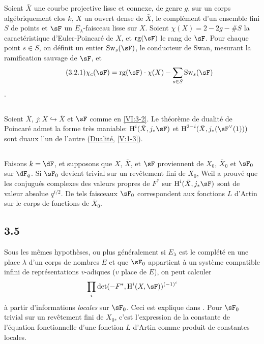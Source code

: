 Soient $\bar X$ une courbe projective lisse et connexe, de genre $g$, sur un 
corps algébriquement clos $k$, $X$ un ouvert dense de $\bar X$, 
le complément d'un ensemble fini $S$ de points et $\sF$ un 
$E_\lambda$-faisceau lisse sur $X$. Soient $\chi(X)=2-2 g-\# S$ la 
caractéristique d'Euler-Poincaré de $X$, et $\operatorname{rg}(\sF)$ le 
rang de $\sF$. Pour chaque point $s\in S$, on définit un entier 
$\swan_s(\sF)$, le conducteur de Swan, mesurant la ramification sauvage de 
$\sF$, et 
\begin{align*}\tag{3.2.1}\label{VI:eq:3-2-1}
  \chi_c(\sF) = \operatorname{rg}(\sF) \cdot \chi(X) - \sum_{s\in S} \swan_s(\sF) 
\end{align*}
\cite{ra65}. 





\subsection{}\label{VI:3-3}

Soient $\bar X$, $j:X\hookrightarrow\bar X$ et $\sF$ comme en \ref{VI:3-2}. Le 
théorème de dualité de Poincaré admet la forme très maniable: 
$\h^i(\bar X,j_\ast \sF)$ et $\h^{2-i}(\bar X,j_\ast(\sF^\vee(1)))$ sont 
duaux l'un de l'autre (\hyperref[V]{Dualité}, \ref{V:1-3}). 





\subsection{}\label{VI:3-4}

Faisons $k=\dF$, et supposons que $X$, $\bar X$, et $\sF$ proviennent de 
$X_0$, $\bar X_0$ et $\sF_0$ sur $\dF_q$. Si $\sF_0$ devient trivial sur un 
revêtement fini de $X_0$, Weil a prouvé que les conjugués complexes des 
valeurs propres de $F^\ast$ sur $\h^i(\bar X,j_\ast\sF)$ sont de valeur 
absolue $q^{i/2}$. De tels faisceaux $\sF_0$ correspondent aux fonctions $L$ 
d'Artin sur le corps de fonctions de $\bar X_0$. 





\subsection*{3.5}\label{VI:3-5_} %

Sous les mêmes hypothèses, ou plus généralement si $E_\lambda$ est le 
complété en une place $\lambda$ d'un corps de nombres $E$ et que $\sF_0$ 
appartient à un système compatible infini de représentations $v$-adiques 
($v$ place de $E$), on peut calculer 
\[
  \prod_i \det(-F^\ast,\h^i(X,\sF))^{(-1)^i} 
\]
à partir d'informations \emph{locales} sur $\sF_0$. Ceci est explique dans 
\cite{de73}. Pour $\sF_0$ trivial sur un revêtement fini de $X_0$, c'est 
l'expression de la constante de l'équation fonctionnelle d'une fonction $L$ 
d'Artin comme produit de constantes locales. 





